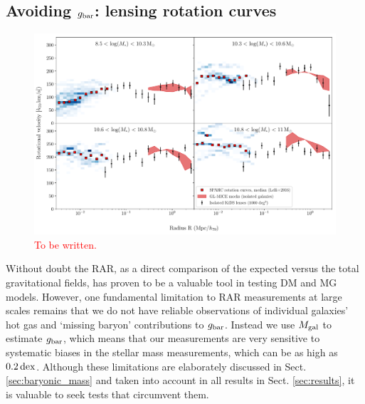 \documentclass[usenatbib]{mnras}
\newcommand{\un}[1]{_{\rm #1}}
\newcommand{\dex}{\, {\rm dex}}
\begin{document}
\subsection{Avoiding $g\un{bar}$: lensing rotation curves}
\label{sec:results-rotation}

\begin{figure}
	\includegraphics[width=\textwidth]{Figures/ESD_KiDS_MICE_mstarbins_iso.pdf}
	\caption{\textcolor{red}{To be written.}}
	\label{fig:Vrot_kids_verlinde_mice}
\end{figure}

Without doubt the RAR, as a direct comparison of the expected versus the total gravitational fields, has proven to be a valuable tool in testing DM and MG models. However, one fundamental limitation to RAR measurements at large scales remains that we do not have reliable observations of individual galaxies' hot gas and `missing baryon' contributions to $g\un{bar}$. Instead we use $M\un{gal}$ to estimate $g\un{bar}$, which means that our measurements are very sensitive to systematic biases in the stellar mass measurements, which can be as high as $0.2 \dex$. Although these limitations are elaborately discussed in Sect. \ref{sec:baryonic_mass} and taken into account in all results in Sect. \ref{sec:results}, it is valuable to seek tests that circumvent them.
\end{document}
